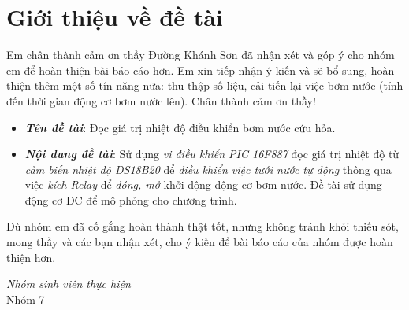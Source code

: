 \chapter*{Giới thiệu về đề tài}
Em chân thành cảm ơn thầy Đường Khánh Sơn đã nhận xét và góp ý cho nhóm em để hoàn thiện bài báo cáo hơn. Em xin tiếp nhận ý kiến và sẽ bổ sung, hoàn thiện thêm một số tín năng nữa: thu thập số liệu, cải tiến lại việc bơm nước (tính đến thời gian động cơ bơm nước lên). Chân thành cảm ơn thầy!
\begin{itemize}
\item \textbf{\textit{Tên đề tài}}: Đọc giá trị nhiệt độ điều khiển bơm nước cứu hỏa.
\item \textbf{\textit{Nội dung đề tài}}: Sử dụng \emph{vi điều khiển PIC 16F887} đọc giá trị nhiệt độ từ \emph{cảm biến nhiệt độ DS18B20} để \emph{điều khiển việc tưới nước tự động} thông qua việc \emph{kích Relay} để \emph{đóng, mở} khởi động động cơ bơm nước. Đề tài sử dụng động cơ DC để mô phỏng cho chương trình.
\end{itemize}

Dù nhóm em đã cố gắng hoàn thành thật tốt, nhưng không tránh khỏi thiếu sót, mong thầy và các bạn nhận xét, cho ý kiến để bài báo cáo của nhóm được hoàn thiện hơn.
\begin{flushright}
\textit{Nhóm sinh viên thực hiện}\vspace{.5cm}\\
Nhóm 7
\end{flushright}